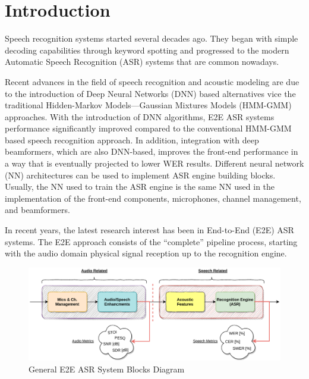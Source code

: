 \chapter{Introduction}
Speech recognition systems
started several decades ago.
They began with simple decoding capabilities through keyword
spotting and progressed to the modern Automatic Speech Recognition (ASR) systems
that are common nowadays\cite{asrBriefHistory}.

Recent advances in the field of speech recognition 
and acoustic modeling are
due to the introduction of 
Deep Neural Networks (DNN) 
based alternatives vice the traditional
Hidden-Markov Models---Gaussian Mixtures Models (HMM-GMM) 
approaches\cite{7472778, 6296526}.
With the introduction of DNN algorithms,
E2E ASR systems performance significantly improved
compared to the conventional HMM-GMM 
based speech recognition approach\cite{7472778, 6296526}.
In addition, integration with deep beamformers,
which are also DNN-based, improves
the front-end performance in a way that is
eventually projected to lower WER results.
Different neural network (NN) 
architectures can be used to
implement ASR engine building blocks.
Usually, the NN used to train the ASR engine 
is the same NN used
in the implementation of the
front-end components, microphones, channel management,
and beamformers.

In recent years, the latest research 
interest has been in 
End-to-End (E2E) ASR systems\cite{boeddeker2018exploring}.
The E2E approach consists of the ``complete'' pipeline process, starting with
the audio domain physical signal reception up to the recognition engine.

\begin{figure}[H]
	\centering
	\includegraphics[width=\linewidth]{Introduction/images/asr_blocks}
	\caption{General E2E ASR System Blocks Diagram}\label{fig:asr_blocks_diagram}
\end{figure}
\vspace{-0.5cm}


